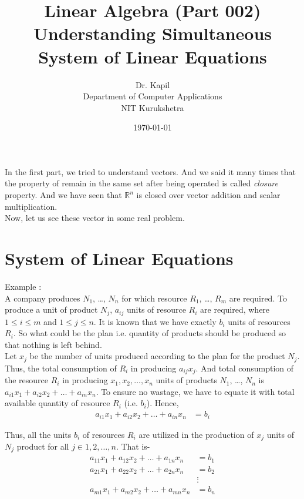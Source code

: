 \documentclass{article}
\title{Linear Algebra (Part 002)\\Understanding Simultaneous System of Linear Equations}
\author{Dr. Kapil\\Department of Computer Applications\\ NIT Kurukshetra}
\date{\today}
\begin{document}
\maketitle
In the first part, we tried to understand vectors. And we said it many times that the property of remain in the same set after being operated is called \textit{closure} property. And we have seen that $\mathbb{R}^n$ is closed over vector addition and scalar multiplication.\\

Now, let us see these vector in some real problem.\\

\section{System of Linear Equations}\label{first_section}
    Example : \\

A company produces $N_1$, \ldots, $N_n$ for which resource $R_1$, \ldots, $R_m$ are required. To produce a unit of product $N_j$, $a_{ij}$ units of resource $R_i$ are required, where $1 \leq i \leq m$ and $1 \leq j \leq n$. It is known that we have exactly $b_i$ units of resources $R_i$. So what could be the plan i.e. quantity of products should be produced so that nothing is left behind.\\

Let $x_j$ be the number of units produced according to the plan for the product $N_j$. Thus, the total consumption of $R_i$ in producing $a_{ij}x_j$. And total consumption of the resource $R_i$ in producing $x_1,x_2,\ldots,x_n$ units of products $N_1$, \ldots, $N_n$ is $a_{i1}x_1 + a_{i2}x_2 + \ldots + a_{in}x_n$. To ensure no wastage, we have to equate it with total available quantity of resource $R_i$ (i.e. $b_i$). Hence,
\begin{align}
   a_{i1}x_1 + a_{i2}x_2 +\ldots+ a_{in}x_n & = b_i\nonumber
\end{align}

Thus, all the units $b_i$ of resources $R_i$ are utilized in the production of $x_j$ units of $N_j$ product for all $j\in{1,2,\ldots,n}$. That is-\\
\begin{align}
    a_{11}x_1 + a_{12}x_2 + \ldots + a_{1n}x_n &= b_1\nonumber\\
    a_{21}x_1 + a_{22}x_2 + \ldots + a_{2n}x_n &= b_2\nonumber\\
    &\vdots\nonumber\\
    a_{m1}x_1 + a_{m2}x_2 + \ldots + a_{mn}x_n &= b_n\nonumber
\end{align}
\end{document}
